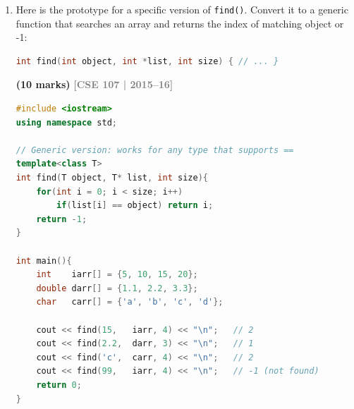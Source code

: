 \documentclass[12pt,a3paper]{article}
\newcommand{\yr}[1]{\hfill\textcolor{gray}{\small\textbf{[#1]}}}
\newcommand{\mk}[1]{\textcolor{orange!70!black}{\small\textbf{(#1 marks)}}}
\begin{document}
\begin{enumerate}
\begin{tcolorbox}[enhanced,breakable,ansbox,colback=cH!4,colframe=cH,
  boxrule=0.8pt,arc=5pt,
  title={\textbf{Answer --- myCalculator template class}},
  fonttitle=\bfseries\color{white},colbacktitle=cH]
\begin{lstlisting}[language=C++]
template<class T>
class myCalculator {
    T a, b;
public:
    myCalculator(T x, T y): a(x), b(y){}

    void displayResult(){
        cout << "Addition: "    << a+b << ", ";
        cout << "Subtraction: " << a-b << ", ";
        cout << "Product: "     << a*b << ", ";
        cout << "Division: "    << a/b << "\n";
    }
};

int main(){
    myCalculator<int>   intCalc(7, 4);
    myCalculator<float> floatCalc(3.4f, 6.2f);

    intCalc.displayResult();
    // Addition: 11, Subtraction: 3, Product: 28, Division: 1

    floatCalc.displayResult();
    // Addition: 9.6, Subtraction: -2.8, Product: 21.08, Division: 0.548387
    return 0;
}
\end{lstlisting}

\end{tcolorbox}



\item Here is the prototype for a specific version of \texttt{find()}. Convert it to a generic function that searches an array and returns the index of matching object or -1:
\begin{lstlisting}[language=C++]
int find(int object, int *list, int size) { // ... }
\end{lstlisting}
\mk{10}
\yr{CSE 107 | 2015--16}
\begin{tcolorbox}[enhanced,breakable,ansbox,colback=cH!4,colframe=cH,
  boxrule=0.8pt,arc=5pt,
  title={\textbf{Answer --- Generic find() function}},
  fonttitle=\bfseries\color{white},colbacktitle=cH]

\begin{lstlisting}[language=C++]
#include <iostream>
using namespace std;

// Generic version: works for any type that supports ==
template<class T>
int find(T object, T* list, int size){
    for(int i = 0; i < size; i++)
        if(list[i] == object) return i;
    return -1;
}

int main(){
    int    iarr[] = {5, 10, 15, 20};
    double darr[] = {1.1, 2.2, 3.3};
    char   carr[] = {'a', 'b', 'c', 'd'};

    cout << find(15,   iarr, 4) << "\n";   // 2
    cout << find(2.2,  darr, 3) << "\n";   // 1
    cout << find('c',  carr, 4) << "\n";   // 2
    cout << find(99,   iarr, 4) << "\n";   // -1 (not found)
    return 0;
}
\end{lstlisting}


\end{tcolorbox}
\end{enumerate}
\end{document}
